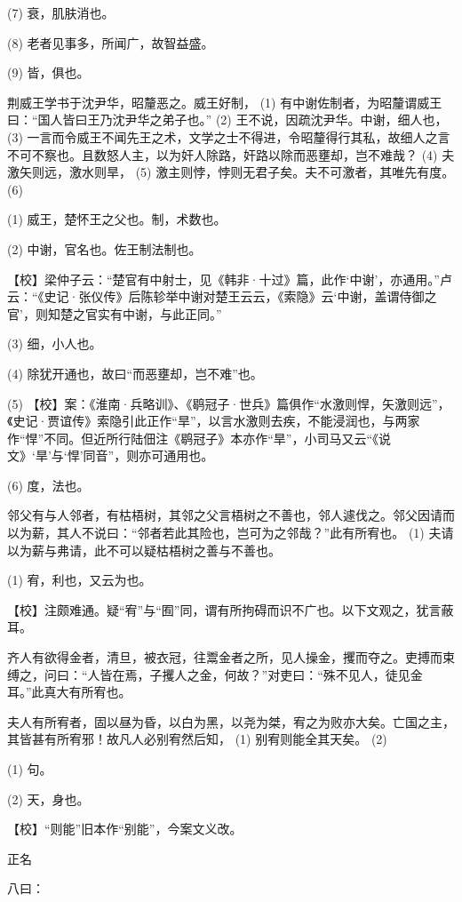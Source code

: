 \documentclass[12pt,UTF8]{ctexbook}
\begin{document}
(7) 衰，肌肤消也。

(8) 老者见事多，所闻广，故智益盛。

(9) 皆，俱也。

荆威王学书于沈尹华，昭釐恶之。威王好制， (1) 有中谢佐制者，为昭釐谓威王曰：“国人皆曰王乃沈尹华之弟子也。” (2) 王不说，因疏沈尹华。中谢，细人也， (3) 一言而令威王不闻先王之术，文学之士不得进，令昭釐得行其私，故细人之言不可不察也。且数怒人主，以为奸人除路，奸路以除而恶壅却，岂不难哉？ (4) 夫激矢则远，激水则旱， (5) 激主则悖，悖则无君子矣。夫不可激者，其唯先有度。 (6)

(1) 威王，楚怀王之父也。制，术数也。

(2) 中谢，官名也。佐王制法制也。

【校】梁仲子云：“楚官有中射士，见《韩非·十过》篇，此作‘中谢’，亦通用。”卢云：“《史记·张仪传》后陈轸举中谢对楚王云云，《索隐》云‘中谢，盖谓侍御之官’，则知楚之官实有中谢，与此正同。”

(3) 细，小人也。

(4) 除犹开通也，故曰“而恶壅却，岂不难”也。

(5) 【校】案：《淮南·兵略训》、《鹖冠子·世兵》篇俱作“水激则悍，矢激则远”，《史记·贾谊传》索隐引此正作“旱”，以言水激则去疾，不能浸润也，与两家作“悍”不同。但近所行陆佃注《鹖冠子》本亦作“旱”，小司马又云“《说文》‘旱’与‘悍’同音”，则亦可通用也。

(6) 度，法也。

邻父有与人邻者，有枯梧树，其邻之父言梧树之不善也，邻人遽伐之。邻父因请而以为薪，其人不说曰：“邻者若此其险也，岂可为之邻哉？”此有所宥也。 (1) 夫请以为薪与弗请，此不可以疑枯梧树之善与不善也。

(1) 宥，利也，又云为也。

【校】注颇难通。疑“宥”与“囿”同，谓有所拘碍而识不广也。以下文观之，犹言蔽耳。

齐人有欲得金者，清旦，被衣冠，往鬻金者之所，见人操金，攫而夺之。吏搏而束缚之，问曰：“人皆在焉，子攫人之金，何故？”对吏曰：“殊不见人，徒见金耳。”此真大有所宥也。

夫人有所宥者，固以昼为昏，以白为黑，以尧为桀，宥之为败亦大矣。亡国之主，其皆甚有所宥邪！故凡人必别宥然后知， (1) 别宥则能全其天矣。 (2)

(1) 句。

(2) 天，身也。

【校】“则能”旧本作“别能”，今案文义改。





正名


八曰：
\end{document}
